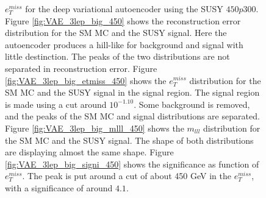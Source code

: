 \begin{figure}[h!]
{    $e_T^{miss}$ for the deep variational autoencoder using the SUSY $450p300$.
    Figure \ref{fig:VAE_3lep_big_450} shows the reconstruction error 
    distribution for the SM MC and the SUSY signal. Here the autoencoder produces a hill-like for background and 
    signal with little destinction. The peaks of the two distributions are not separated in reconstruction error. Figure \ref{fig:VAE_3lep_big_etmiss_450} 
    shows the $e_T^{miss}$ distribution for the SM MC and the SUSY signal in the signal region. 
    The signal region is made using a cut around $10^{-1.10}$. Some background is removed, and the peaks of the SM MC and signal 
    distributions are separated. Figure \ref{fig:VAE_3lep_big_mlll_450} shows the $m_{lll}$ distribution for the SM MC and the SUSY signal. 
    The shape of both distributions are displaying almost the same shape. Figure \ref{fig:VAE_3lep_big_signi_450} shows the significance as 
    function of $e_T^{miss}$. The peak is put around a cut of about 450 GeV in the $e_T^{miss}$, with a significance of around $4.1$.}
    \label{fig:VAE_3lep_big_rec_sig_signi_450}
\end{figure}

